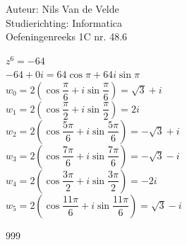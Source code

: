 \documentclass[a4paper]{article}
\begin{document}
  
\noindent \large Auteur: Nils Van de Velde \\
\noindent \large Studierichting: Informatica\\
\noindent \large Oefeningenreeks 1C nr. 48.6\\

\medskip

\normalsize

$z^6 = -64$\\

$-64 + 0i = 64 \cos\pi + 64i \sin\pi$\\

$w_0 = 2\left(\cos\dfrac{\pi}{6} + i\sin\dfrac{\pi}{6}\right) = \sqrt{3} + i$\\

$w_1 = 2\left(\cos\dfrac{\pi}{2} + i\sin\dfrac{\pi}{2}\right) = 2i$\\

$w_2 = 2\left(\cos\dfrac{5\pi}{6} + i\sin\dfrac{5\pi}{6}\right) = -\sqrt{3} + i$\\

$w_3 = 2\left(\cos\dfrac{7\pi}{6} + i\sin\dfrac{7\pi}{6}\right) = -\sqrt{3} - i$\\

$w_4 = 2\left(\cos\dfrac{3\pi}{2} + i\sin\dfrac{3\pi}{2}\right) = -2i$\\

$w_5 = 2\left(\cos\dfrac{11\pi}{6} + i\sin\dfrac{11\pi}{6}\right) = \sqrt{3} - i$\\

\begin{thebibliography}{999}
\end{thebibliography}
\end{document}
